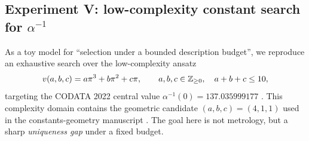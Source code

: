 \begin{table}[t]
\centering
{}
\caption{$\zeta(3)$ realized via a three-dimensional scan with auditable truncation. The third column uses the certified reference $\zeta(3)_{\mathrm{ref}}$ defined above; it satisfies $|\zeta(3)-\zeta(3)_{\mathrm{ref}}|\le 1/(4M_{\mathrm{ref}}^2)$. As in Table~\ref{tab:zeta2_scan}, for each $(N,M,K)$ case the ETK truncation parameter $H$ (second column) is chosen by minimizing the computable Kronecker bracket term $B_{N,H}(\alpha;N)$ (Definition~\ref{def:kronecker_bracket}) over the fixed candidate set $\mathcal{H}_3=\{10,20,30,40,50,60,80,100\}$. The last three columns report this $B_{N,H}(\alpha;N)$ (written as $B_{N,H}$ in the table) and the resulting fully numerical sampling certificate obtained from the ETK inequality with the explicit constant $C_3=(3/2)^3=27/8$ (Theorem~\ref{thm:etk}): namely $D_N^\ast(P_N)\le \frac{27}{8}B_{N,H}(\alpha;N)$ and hence $|\overline{\avgN{\mathcal{P}}}_K-H_M^{(3)}|\le \frac{27}{8}\HKVar(g_M)B_{N,H}(\alpha;N)$. The ratio column is $|\overline{\avgN{\mathcal{P}}}_K-H_M^{(3)}|/(\frac{27}{8}\HKVar(g_M)B_{N,H}(\alpha;N))$.}
\label{tab:zeta3_scan}
\end{table}

\subsection{Experiment V: low-complexity constant search for \texorpdfstring{$\alpha^{-1}$}{alpha inverse}}
\label{sec:constant_search_experiment}

As a toy model for ``selection under a bounded description budget'', we reproduce an exhaustive search over the low-complexity ansatz
\begin{equation}
\label{eq:alpha_ansatz}
v(a,b,c)=a\pi^3+b\pi^2+c\pi,\qquad a,b,c\in\mathbb{Z}_{\ge 0},\quad a+b+c\le 10,
\end{equation}
targeting the CODATA 2022 central value $\alpha^{-1}(0)=137.035999177$ \cite{CODATA2022RMP}. This complexity domain contains the geometric candidate $(a,b,c)=(4,1,1)$ used in the constants-geometry manuscript \cite{Ma2025PCG}. The goal here is not metrology, but a sharp \emph{uniqueness gap} under a fixed budget.


